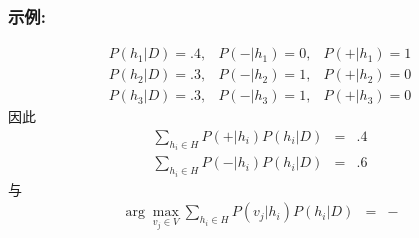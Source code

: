 \documentclass{beamer}
\begin{document}
\begin{frame}
\frametitle{示例:}
\label{sec-6-3}


\begin{eqnarray}
P(h_{1}|D)=.4, & P(-|h_{1})=0, & P(+|h_{1})=1 \nonumber \\
P(h_{2}|D)=.3, & P(-|h_{2})=1, & P(+|h_{2})=0 \nonumber \\
P(h_{3}|D)=.3, & P(-|h_{3})=1, & P(+|h_{3})=0 \nonumber 
\end{eqnarray}
因此
\begin{eqnarray}
\sum_{h_{i} \in H} P(+|h_{i}) P(h_{i}|D) & = & .4 \nonumber \\
\sum_{h_{i} \in H} P(-|h_{i}) P(h_{i}|D) & = & .6 \nonumber
\end{eqnarray}
与
\begin{eqnarray}
\arg \max_{v_{j} \in V} \sum_{h_{i} \in H} P(v_{j}|h_{i}) P(h_{i}|D) & = & -
\nonumber 
\end{eqnarray}
\end{frame}
\end{document}

